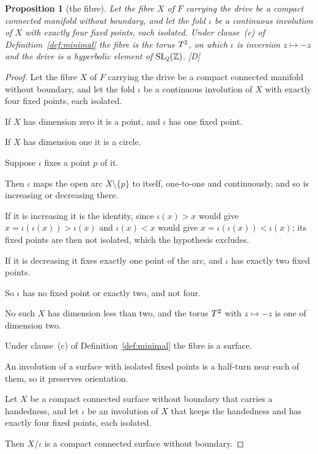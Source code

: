 \documentclass[11pt,a4paper]{article}
\theoremstyle{plain}
\newtheorem{proposition}[theorem]{Proposition}
\theoremstyle{definition}
\theoremstyle{remark}
\newcommand{\rigD}{[\textup{D}]}
\begin{document}
\begin{proposition}[the fibre]\label{prop:surface}
Let the fibre $X$ of $F$ carrying the drive be a compact connected manifold without boundary, and let the fold $\iota$ be a continuous involution of $X$ with exactly four fixed points, each isolated.
Under clause~(c) of Definition~\ref{def:minimal} the fibre is the torus $T^2$, on which $\iota$ is inversion $z\mapsto-z$ and the drive is a hyperbolic element of $\mathrm{SL}_{2}(\mathbb{Z})$.
 \rigD
\end{proposition}

\begin{proof}
Let the fibre $X$ of $F$ carrying the drive be a compact connected manifold without boundary, and let the fold $\iota$ be a continuous involution of $X$ with exactly four fixed points, each isolated.

If $X$ has dimension zero it is a point, and $\iota$ has one fixed point.

If $X$ has dimension one it is a circle.

Suppose $\iota$ fixes a point $p$ of it.

Then $\iota$ maps the open arc $X\setminus\{p\}$ to itself, one-to-one and continuously, and so is increasing or decreasing there.

If it is increasing it is the identity, since $\iota(x)>x$ would give $x=\iota(\iota(x))>\iota(x)$ and $\iota(x)<x$ would give $x=\iota(\iota(x))<\iota(x)$; its fixed points are then not isolated, which the hypothesis excludes.

If it is decreasing it fixes exactly one point of the arc, and $\iota$ has exactly two fixed points.

So $\iota$ has no fixed point or exactly two, and not four.

No such $X$ has dimension less than two, and the torus $T^2$ with $z\mapsto-z$ is one of dimension two.

Under clause~(c) of Definition~\ref{def:minimal} the fibre is a surface.

An involution of a surface with isolated fixed points is a half-turn near each of them, so it preserves orientation.

Let $X$ be a compact connected surface without boundary that carries a handedness, and let $\iota$ be an involution of $X$ that keeps the handedness and has exactly four fixed points, each isolated.

Then $X/\iota$ is a compact connected surface without boundary.


\end{proof}
\end{document}
